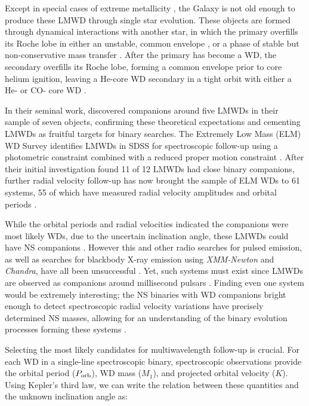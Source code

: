\documentclass[apjl]{emulateapj}
\begin{document}
Except in special cases of extreme metallicity \citep{kilic07}, the Galaxy is not old enough to produce these LMWD through single star evolution. These objects are formed through dynamical interactions with another star, in which the primary overfills its Roche lobe in either an unstable, common envelope \citep{vdSluys06}, or a phase of stable but non-conservative mass transfer \citep{woods12}. After the primary has become a WD, the secondary overfills its Roche lobe, forming a common envelope prior to core helium ignition, leaving a He-core WD secondary in a tight orbit with either a He- or CO- core WD \citep{han98}.


In their seminal work, \citet{marsh95} discovered companions around five LMWDs in their sample of seven objects, confirming these theoretical expectations and cementing LMWDs as fruitful targets for binary searches. The Extremely Low Mass (ELM) WD Survey identifies LMWDs in SDSS for spectroscopic follow-up using a photometric constraint combined with a reduced proper motion constraint \citep{ELMI}. After their initial investigation found 11 of 12 LMWDs had close binary companions, further radial velocity follow-up has now brought the sample of ELM WDs to 61 systems, 55 of which have measured radial velocity amplitudes and orbital periods \citep{ELMII, ELMIII, ELMIV, ELMV}.


While the orbital periods and radial velocities indicated the companions were most likely WDs, due to the uncertain inclination angle, these LMWDs could have NS companions \citep{vLeeuwen07}. However this and other radio searches for pulsed emission, as well as searches for blackbody X-ray emission using {\it XMM-Newton} and {\it Chandra}, have all been unsuccessful \citep{agueros09a,agueros09b,kilic13}. Yet, such systems must exist since LMWDs are observed as companions around millisecond pulsars \citep{vKerkwijk96,callanan98,bassa06,antoniadis12}. Finding even one system would be extremely interesting; the NS binaries with WD companions bright enough to detect spectroscopic radial velocity variations have precisely determined NS masses, allowing for an understanding of the binary evolution processes forming these systems . 


Selecting the most likely candidates for multiwavelength follow-up is crucial. For each WD in a single-line spectroscopic binary, spectroscopic observations provide the orbital period ($P_{\rm orb}$), WD mass ($M_1$), and projected orbital velocity ($K$). Using Kepler's third law, we can write the relation between these quantities and the unknown inclination angle as:
\end{document}
